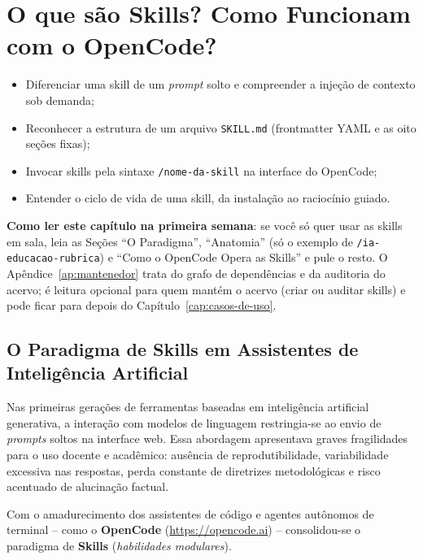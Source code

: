 \chapter{O que s{\~a}o Skills? Como Funcionam com o OpenCode?}
\label{cap:skills-opencode}

\begin{objetivos}
\begin{itemize}
  \item Diferenciar uma skill de um \emph{prompt} solto e compreender a inje{\c c}{\~a}o de contexto sob demanda;
  \item Reconhecer a estrutura de um arquivo \texttt{SKILL.md} (frontmatter YAML e as oito se{\c c}{\~o}es fixas);
  \item Invocar skills pela sintaxe \texttt{/nome-da-skill} na interface do OpenCode;
  \item Entender o ciclo de vida de uma skill, da instala{\c c}{\~a}o ao racioc{\'i}nio guiado.
\end{itemize}
\end{objetivos}

\begin{dicaopencode}
\textbf{Como ler este cap{\'i}tulo na primeira semana}: se voc{\^e} s{\'o} quer usar as skills em sala, leia as Se{\c c}{\~o}es ``O Paradigma'', ``Anatomia'' (s{\'o} o exemplo de \texttt{/ia-educacao-rubrica}) e ``Como o OpenCode Opera as Skills'' e pule o resto. O Ap{\^e}ndice~\ref{ap:mantenedor} trata do grafo de depend{\^e}ncias e da auditoria do acervo; {\'e} leitura opcional para quem mant{\'e}m o acervo (criar ou auditar skills) e pode ficar para depois do Cap{\'i}tulo~\ref{cap:casos-de-uso}.
\end{dicaopencode}

\section{O Paradigma de Skills em Assistentes de Intelig{\^e}ncia Artificial}

Nas primeiras gera{\c c}{\~o}es de ferramentas baseadas em intelig{\^e}ncia artificial generativa, a intera{\c c}{\~a}o com modelos de linguagem restringia-se ao envio de \emph{prompts} soltos na interface web. Essa abordagem apresentava graves fragilidades para o uso docente e acad{\^e}mico: aus{\^e}ncia de reprodutibilidade, variabilidade excessiva nas respostas, perda constante de diretrizes metodol{\'o}gicas e risco acentuado de alucina{\c c}{\~a}o factual.

Com o amadurecimento dos assistentes de c{\'o}digo e agentes aut{\^o}nomos de terminal -- como o \textbf{OpenCode} (\url{https://opencode.ai}) -- consolidou-se o paradigma de \textbf{Skills} (\emph{habilidades modulares}). 


